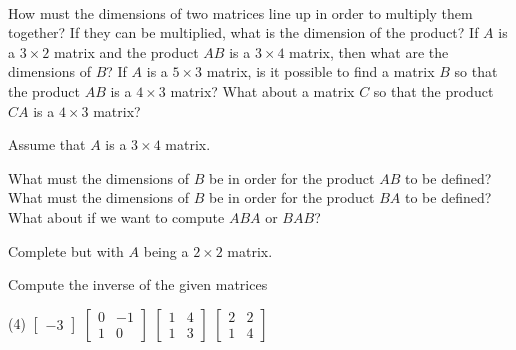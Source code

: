 \pagebreak

\begin{exercise}
\ 
\begin{tasks}
\task How must the dimensions of two matrices line up in order to multiply them together? If they can be multiplied, what is the dimension of the product?
\task If $A$ is a $3 \times 2$ matrix and the product $AB$ is a $3 \times 4$ matrix, then what are the dimensions of $B$?
\task If $A$ is a $5 \times 3$ matrix, is it possible to find a matrix $B$ so that the product $AB$ is a $4 \times 3$ matrix? What about a matrix $C$ so that the product $CA$ is a $4 \times 3$ matrix?
\end{tasks}
\end{exercise}

\begin{exercise} \label{ex:MatDims}
Assume that $A$ is a $3\times 4$ matrix.
\begin{tasks}
\task What must the dimensions of $B$ be in order for the product $AB$ to be defined?
\task What must the dimensions of $B$ be in order for the product $BA$ to be defined?
\task What about if we want to compute $ABA$ or $BAB$?
\end{tasks} 
\end{exercise}

\begin{exercise}
Complete \exerciseref{ex:MatDims} but with $A$ being a $2 \times 2$ matrix.
\end{exercise}

\begin{exercise}
Compute the inverse of the given matrices
\begin{tasks}(4)
\task
$\begin{bmatrix}
-3
\end{bmatrix}$
\task
$\begin{bmatrix}
0 & -1 \\
1 & 0
\end{bmatrix}$
\task
$\begin{bmatrix}
1 & 4 \\
1 & 3
\end{bmatrix}$
\task
$\begin{bmatrix}
2 & 2 \\
1 & 4
\end{bmatrix}$
\end{tasks}
\end{exercise}


